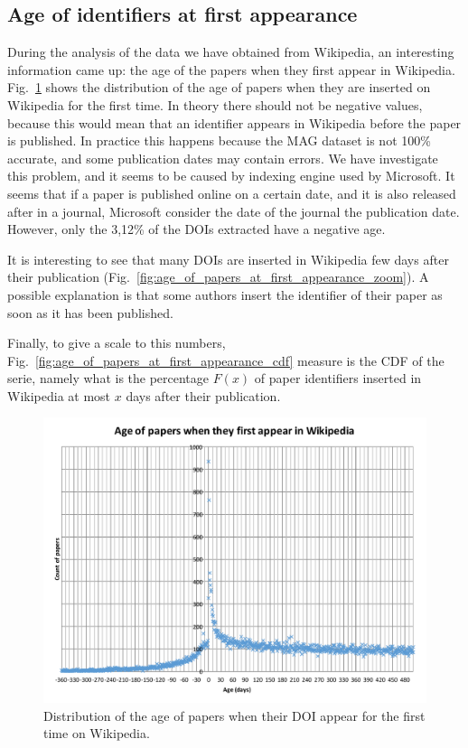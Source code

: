 \subsection{Age of identifiers at first appearance}
During the analysis of the data we have obtained from Wikipedia, an interesting information came up: the age of the papers when they first appear in Wikipedia.
Fig.~\ref{fig:age_of_papers_at_first_appearance} shows the distribution of the age of papers when they are inserted on Wikipedia for the first time.
In theory there should not be negative values, because this would mean that an identifier appears in Wikipedia before the paper is published.
In practice this happens because the \ac{MAG} dataset is not 100\% accurate, and some publication dates may contain errors.
We have investigate this problem, and it seems to be caused by indexing engine used by Microsoft.
It seems that if a paper is published online on a certain date, and it is also released after in a journal, Microsoft consider the date of the journal the publication date.
However, only the 3,12\% of the \acp{DOI} extracted have a negative age.

It is interesting to see that many \acp{DOI} are inserted in Wikipedia few days after their publication (Fig.~\ref{fig:age_of_papers_at_first_appearance_zoom}).
A possible explanation is that some authors insert the identifier of their paper as soon as it has been published.

Finally, to give a scale to this numbers, Fig.~\ref{fig:age_of_papers_at_first_appearance_cdf} measure is the \ac{CDF} of the serie, namely what is the percentage $F(x)$ of paper identifiers inserted in Wikipedia at most $x$ days after their publication.


\begin{figure}[h]
\centering
\includegraphics[keepaspectratio=true, width=\textwidth]{assets/age_of_papers_at_first_appearance}
\caption{Distribution of the age of papers when their DOI appear for the first time on Wikipedia.}
\label{fig:age_of_papers_at_first_appearance}
\end{figure}


